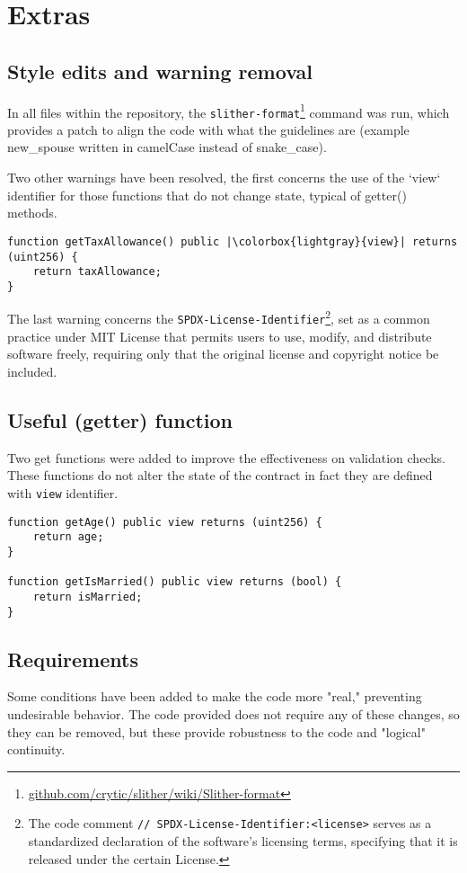 \documentclass{article}
\begin{document}
\section{Extras}
\subsection{Style edits and warning removal}
In all files within the repository, the \texttt{slither-format}\footnote{\href{https://github.com/crytic/slither/wiki/Slither-format}{github.com/crytic/slither/wiki/Slither-format}} command was run, which provides a patch to align the code with what the guidelines are (example new\_spouse written in camelCase instead of snake\_case).

Two other warnings have been resolved, the first concerns the use of the `view` identifier for those functions that do not change state, typical of getter() methods.
\begin{verbatim}
function getTaxAllowance() public |\colorbox{lightgray}{view}| returns (uint256) {
    return taxAllowance;
}
\end{verbatim}
The last warning concerns the \texttt{SPDX-License-Identifier}\footnote{The code comment \texttt{// SPDX-License-Identifier:<license>} serves as a standardized declaration of the software's licensing terms, specifying that it is released under the certain License.}, set as a common practice under MIT License that permits users to use, modify, and distribute software freely, requiring only that the original license and copyright notice be included.

\subsection{Useful (getter) function}
Two get functions were added to improve the effectiveness on validation checks. These functions do not alter the state of the contract in fact they are defined with \texttt{view} identifier.
\begin{verbatim}
function getAge() public view returns (uint256) {
    return age;
}

function getIsMarried() public view returns (bool) {
    return isMarried;
}
\end{verbatim}
\subsection{Requirements}
Some conditions have been added to make the code more "real," preventing undesirable behavior. The code provided does not require any of these changes, so they can be removed, but these provide robustness to the code and "logical" continuity.
\end{document}
